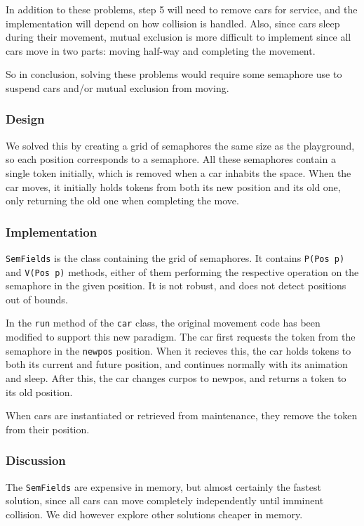 In addition to these problems, step 5 will need to remove cars for service, and the implementation will depend on how collision is handled. Also, since cars sleep during their movement, mutual exclusion is more difficult to implement since all cars move in two parts: moving half-way and completing the movement.

So in conclusion, solving these problems would require some semaphore use to suspend cars and/or mutual exclusion from moving.

\subsubsection{Design}
We solved this by creating a grid of semaphores the same size as the playground, so each position corresponds to a semaphore. All these semaphores contain a single token initially, which is removed when a car inhabits the space. When the car moves, it initially holds tokens from both its new position and its old one, only returning the old one when completing the move.

\subsubsection{Implementation}
\texttt{SemFields} is the class containing the grid of semaphores. It contains \texttt{P(Pos p)} and \texttt{V(Pos p)} methods, either of them performing the respective operation on the semaphore in the given position. It is not robust, and does not detect positions out of bounds.

In the \texttt{run} method of the \texttt{car} class, the original movement code has been modified to support this new paradigm. The car first requests the token from the semaphore in the \texttt{newpos} position. When it recieves this, the car holds tokens to both its current and future position, and continues normally with its animation and sleep. After this, the car changes curpos to newpos, and returns a token to its old position.

When cars are instantiated or retrieved from maintenance, they remove the token from their position.

\subsubsection{Discussion}
The \texttt{SemFields} are expensive in memory, but almost certainly the fastest solution, since all cars can move completely independently until imminent collision. We did however explore other solutions cheaper in memory.

